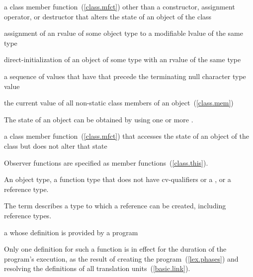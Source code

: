 %
a class member function~(\ref{class.mfct}) other than a constructor,
assignment operator, or destructor
that alters the state of an object of the class

%
assignment of an rvalue of some object type to a modifiable lvalue of the same type

%
direct-initialization of an object of some type with an rvalue of the same type

%
%
a sequence of values that have
that precede the terminating null character type
value

%
the current value of all non-static class members of an object~(\ref{class.mem})\\
\begin{note}
The state of an object can be obtained by using one or more
.
\end{note}

%
a class member function~(\ref{class.mfct}) that accesses the state of an object of the class 
but does not alter that state\\
\begin{note}
Observer functions are specified as
member functions~(\ref{class.this}).
\end{note}

An object type, a function type that does not have cv-qualifiers or a
, or a reference type.
\begin{note} The term describes a type to which a reference can be created,
including reference types. \end{note}

%
a
whose definition is provided by a \Cpp program\\
\begin{note}
Only one definition for such a function is in effect for the duration of the program's
execution, as the result of creating the program~(\ref{lex.phases}) and resolving the
definitions of all translation units~(\ref{basic.link}).
\end{note}

